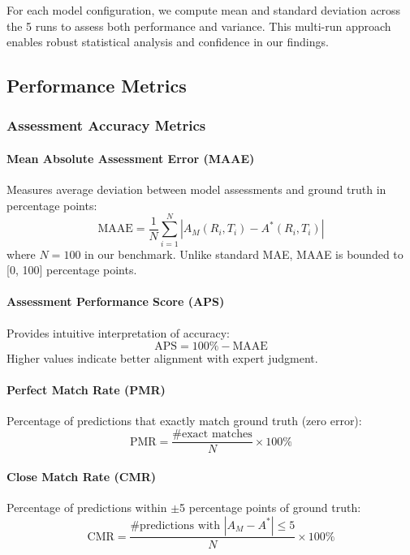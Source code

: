 \documentclass[letterpaper]{article} %
\begin{document}
For each model configuration, we compute mean and standard deviation across the 5 runs to assess both performance and variance. This multi-run approach enables robust statistical analysis and confidence in our findings.

\subsection{Performance Metrics}

\subsubsection{Assessment Accuracy Metrics}

\paragraph{Mean Absolute Assessment Error (MAAE)}
Measures average deviation between model assessments and ground truth in percentage points:
\begin{equation}
\text{MAAE} = \frac{1}{N}\sum_{i=1}^{N} |A_M(R_i, T_i) - A^*(R_i, T_i)|
\end{equation}
where $N=100$ in our benchmark. Unlike standard MAE, MAAE is bounded to [0, 100] percentage points.

\paragraph{Assessment Performance Score (APS)}
Provides intuitive interpretation of accuracy:
\begin{equation}
\text{APS} = 100\% - \text{MAAE}
\end{equation}
Higher values indicate better alignment with expert judgment.

\paragraph{Perfect Match Rate (PMR)}
Percentage of predictions that exactly match ground truth (zero error):
\begin{equation}
\text{PMR} = \frac{\text{\# exact matches}}{N} \times 100\%
\end{equation}

\paragraph{Close Match Rate (CMR)}
Percentage of predictions within $\pm$5 percentage points of ground truth:
\begin{equation}
\text{CMR} = \frac{\text{\# predictions with } |A_M - A^*| \leq 5}{N} \times 100\%
\end{equation}
\end{document}
